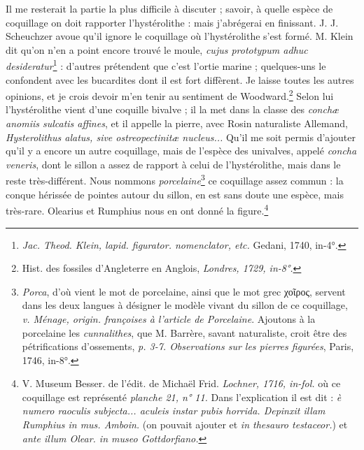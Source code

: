 \documentclass[a4paper, 11pt, oneside, polutonikogreek, french]{article}
\begin{document}
Il me resterait la partie la plus difficile à discuter ; savoir, à quelle espèce de coquillage on doit rapporter l'hystérolithe : mais j'abrégerai en finissant. J. J. Scheuchzer avoue qu'il ignore le coquillage où l'hystérolithe s'est formé. M. Klein dit qu'on n'en a point encore trouvé le moule, \emph{cujus prototypum adhuc desideratur}\footnote{\emph{Jac. Theod. Klein, lapid. figurator. nomenclator, etc.} Gedani, 1740, in-4°.} : d'autres prétendent que c'est l'ortie marine ; quelques-uns le confondent avec les bucardites dont il est fort diffèrent. Je laisse toutes les autres opinions, et je crois devoir m'en tenir au sentiment de Woodward.\footnote{Hist. des fossiles d'Angleterre en Anglois, \emph{Londres, 1729, in-8°.}} Selon lui l'hystérolithe vient d'une coquille bivalve ; il la met dans la classe des \emph{conchæ anomiis sulcatis affines}, et il appelle la pierre, avec Rosin naturaliste Allemand, \emph{Hysterolithus alatus, sive ostreopectinitæ nucleus...} Qu'il me soit permis d'ajouter qu'il y a encore un autre coquillage, mais de l'espèce des univalves, appelé \emph{concha veneris}, dont le sillon a assez de rapport à celui de l'hystérolithe, mais dans le reste très-différent. Nous nommons \emph{porcelaine}\footnote{\emph{Porca}, d'où vient le mot de porcelaine, ainsi que le mot grec χοῖρος, servent dans les deux langues à désigner le modèle vivant du sillon de ce coquillage, \emph{v. Ménage, origin. françoises à l'article de Porcelaine}. Ajoutons à la porcelaine les \emph{cunnalithes}, que M. Barrère, savant naturaliste, croit être des pétrifications d'ossements, \emph{p. 3-7. Observations sur les pierres figurées}, Paris, 1746, in-8°.} ce coquillage assez commun : la conque hérissée de pointes autour du sillon, en est sans doute une espèce, mais très-rare. Olearius et Rumphius nous en ont donné la figure.\footnote{V. Museum Besser. de l'édit. de Michaël Frid. \emph{Lochner, 1716, in-fol.} où ce coquillage est représenté \emph{planche 21, n° 11.} Dans l'explication il est dit : \emph{è numero raoculis subjecta... aculeis instar pubis horrida. Depinxit illam Rumphius in mus. Amboin.} (on pouvait ajouter et \emph{in thesauro testaceor.}) et \emph{ante illum Olear. in museo Gottdorfiano.}}
\clearpage
\end{document}
